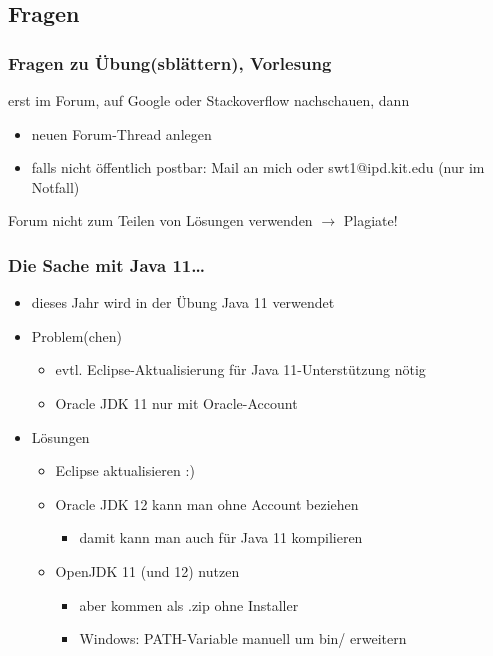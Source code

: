 \documentclass[18pt]{beamer}
\begin{document}
		
		
	\subsection{Fragen}
		\begin{frame}
			\frametitle{Fragen zu Übung(sblättern), Vorlesung}
			erst im Forum, auf Google oder Stackoverflow nachschauen, dann
				\begin{itemize}
					\item neuen Forum-Thread anlegen
					\item falls nicht öffentlich postbar: Mail an mich oder swt1@ipd.kit.edu (nur im Notfall)
				\end{itemize}
			Forum nicht zum Teilen von Lösungen verwenden $\rightarrow$ Plagiate!
		\end{frame}
	
		\begin{frame}
	\frametitle{Die Sache mit Java 11\dots}
	\begin{itemize}
		\item dieses Jahr wird in der Übung Java 11 verwendet
		\item Problem(chen)
		\begin{itemize}
			\item evtl. Eclipse-Aktualisierung für Java 11-Unterstützung nötig
			\item Oracle JDK 11 nur mit Oracle-Account
		\end{itemize}
		\item Lösungen
		\begin{itemize}
			\item Eclipse aktualisieren :)
			\item Oracle JDK 12 kann man ohne Account beziehen
			\begin{itemize}
				\item damit kann man auch für Java 11 kompilieren
			\end{itemize}
			\item OpenJDK 11 (und 12) nutzen
			\begin{itemize}
				\item aber kommen als .zip ohne Installer 
				\item Windows: PATH-Variable manuell um bin/ erweitern
			\end{itemize} 
		\end{itemize}
	\end{itemize}
\end{frame}
		
\end{document}
